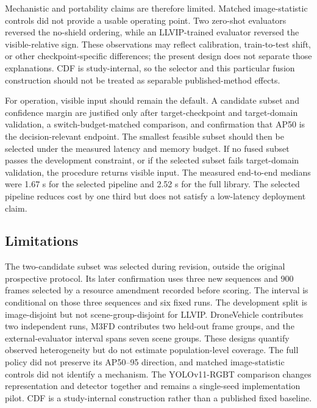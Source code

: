 Mechanistic and portability claims are therefore limited. Matched
image-statistic controls did not provide a usable operating point. Two
zero-shot evaluators reversed the no-shield ordering, while an LLVIP-trained
evaluator reversed the visible-relative sign. These observations may reflect
calibration, train-to-test shift, or other checkpoint-specific differences;
the present design does not separate those explanations. CDF is study-internal,
so the selector and this particular fusion construction should not be treated
as separable published-method effects.

For operation, visible input should remain the default. A candidate subset and
confidence margin are justified only after target-checkpoint and
target-domain validation, a switch-budget-matched comparison, and confirmation
that AP50 is the decision-relevant endpoint. The smallest feasible subset
should then be selected under the measured latency and memory budget. If no
fused subset passes the development constraint, or if the selected subset
fails target-domain validation, the procedure returns visible input. The
measured end-to-end medians were 1.67 s for the selected pipeline and 2.52 s
for the full library. The selected pipeline reduces cost by one third but does
not satisfy a low-latency deployment claim.

\subsection*{Limitations}

The two-candidate subset was selected during revision, outside the original
prospective protocol. Its later confirmation uses three new sequences and 900
frames selected by a resource amendment recorded before scoring. The interval
is conditional on those three sequences and six fixed runs. The development
split is image-disjoint but not scene-group-disjoint for LLVIP. DroneVehicle
contributes two independent runs, M3FD contributes two held-out frame groups,
and the external-evaluator interval spans seven scene groups. These designs
quantify observed heterogeneity but do not estimate population-level coverage.
The full policy did not preserve its AP50--95 direction, and matched
image-statistic controls did not identify a mechanism. The YOLOv11-RGBT
comparison changes representation and detector together and remains a
single-seed implementation pilot. CDF is a study-internal construction rather
than a published fixed baseline.
